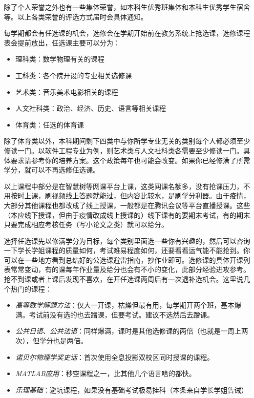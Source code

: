 除了个人荣誉之外也有一些集体荣誉，如本科生优秀班集体和本科生优秀学生宿舍等。以上各类荣誉的评选方式届时会具体通知。


每学期都会有任选课的机会，选修会在学期开始前在教务系统上\sout{抢}选课，选修课程表会提前放出，任选课主要可以分为：
\begin{itemize}
    \kaishu
    \item 理科类：数学物理有关的课程
    \item 工科类：各个院开设的专业相关选修课
    \item 艺术类：音乐美术电影相关的课程
    \item 人文社科类：政治、经济、历史、语言等相关课程
    \item 体育类：任选的体育课
\end{itemize}

除了体育类以外，本科期间剩下四类中与你所学专业无关的类别每个人都必须至少修读一门。以软件工程专业为例，则艺术类与人文社科类各需要至少修读一门。具体要求请参考你的培养方案。这个政策每年也可能会改变。如果你已经修满了所需学分，就可以不再选修任选课。

以上课程中部分是在智慧树等网课平台上课，这类网课名额多，没有抢课压力，不用按时上课，刷视频线上答题就能过，但内容比较水，是刷学分利器。由于疫情，大部分其他课程也都改成了线上授课，一般都是在腾讯会议等平台直播授课。这些（本应线下授课，但由于疫情改成线上授课的）线下课有的要期末考试，有的期末只要完成相应考核任务（写小论文之类）就可以给分。

选择任选课先以修满学分为目标，每个类别里面选一些你有兴趣的，然后可以咨询一下学长学姐课程的质量如何，考试难易程度如何，还要看看运气能不能抢到。你可以在一些地方看到总结好的公选课避雷指南，抄作业即可。选修课的具体开课列表常常变动，有的课每年作业量及给分也会有不小的变化，此部分经验进攻参考。抢不到课或者上课后发现不喜欢，在开任选课两周后有一次退补选机会。这里说几个热门的课程：

\begin{itemize}
    \item \emph{高等数学解题方法}：仅大一开课，枯燥但最有用，每学期开两个班，基本爆满。考试前没有选的也去蹭课，但要考试。建议不选然后去蹭课。
    \item \emph{公共日语}、\emph{公共法语}：同样爆满，课时是其他选修课的两倍（也就是一周上两次），但学分也是两倍。
    \item \emph{诺贝尔物理学奖史话}：首次使用全息投影双校区同时授课的课程。
    \item \emph{MATLAB应用}：秒空课程之一，比其他几个语言啥的都快。
    \item \emph{乐理基础}：避坑课程，如果没有基础考试极易挂科（本条来自学长学姐告诫）
\end{itemize}

